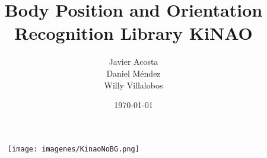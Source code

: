 \documentclass{beamer}
\title[KiNAO]{Body Position and Orientation Recognition Library KiNAO} %
\author{Javier Acosta\\Daniel Méndez\\Willy Villalobos} %
\institute[UCR] %
{
Universidad de Costa Rica \\ %
\medskip
\textit{} %
}
\date{\today} %
\begin{document}
	\begin{frame}
		\titlepage %
	\end{frame}

	\begin{frame}

		\begin{figure}
			\centering
			\texttt{[image: imagenes/KinaoNoBG.png]}
		\end{figure}

	\end{frame}





\end{document}
